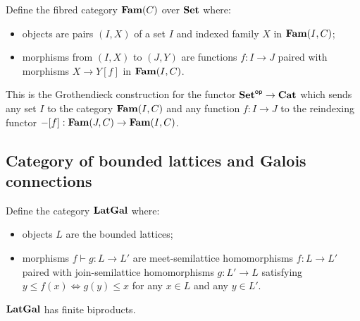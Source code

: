 Define the fibred category $\mathbf{Fam}(C)$ over $\mathbf{Set}$ where:
\begin{itemize}
\item objects are pairs $(I, X)$ of a set $I$ and indexed family $X$ in $\mathbf{Fam}(I,C)$;
\item morphisms from $(I, X)$ to $(J, Y)$ are functions $f: I \to J$ paired with morphisms $X \to Y[f]$ in
$\mathbf{Fam}(I,C)$.
\end{itemize}

\noindent This is the Grothendieck construction for the functor $\mathbf{Set}^{\mathsf{op}} \to \mathbf{Cat}$ which sends any set $I$
to the category $\mathbf{Fam}(I,C)$ and any function $f: I \to J$ to the reindexing functor $-[f]: \mathbf{Fam}(J,C) \to
\mathbf{Fam}(I,C)$.


\subsection{Category of bounded lattices and Galois connections}

Define the category $\mathbf{LatGal}$ where:
\begin{itemize}
\item objects $L$ are the bounded lattices;
\item morphisms $f \vdash g: L \to L'$ are meet-semilattice homomorphisms $f: L \to L'$ paired with
join-semilattice homomorphisms $g: L' \to L$ satisfying $y \leq f(x) \iff g(y) \leq x$ for any $x \in L$ and any
$y \in L'$.
\end{itemize}

\noindent $\mathbf{LatGal}$ has finite biproducts. 
